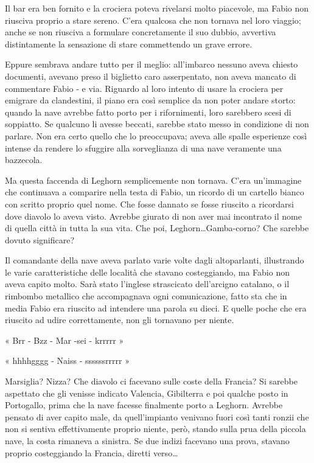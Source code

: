 Il bar era ben fornito e la crociera poteva rivelarsi molto piacevole, ma Fabio non riusciva proprio a stare sereno. C'era qualcosa che non tornava nel loro viaggio; anche se non riusciva a formulare concretamente il suo dubbio, avvertiva distintamente la sensazione di stare commettendo un grave errore.

Eppure sembrava andare tutto per il meglio: all'imbarco nessuno aveva chiesto documenti, avevano preso il biglietto \- caro asserpentato, non aveva mancato di commentare Fabio - e via. Riguardo al loro intento di usare la crociera per emigrare da clandestini, il piano era così semplice da non poter andare storto: quando la nave avrebbe fatto porto per i rifornimenti, loro sarebbero scesi di soppiatto. Se qualcuno li avesse beccati, sarebbe stato messo in condizione di non parlare. Non era certo quello che lo preoccupava; aveva alle spalle esperienze così intense da rendere lo sfuggire alla sorveglianza di una nave veramente una bazzecola.

Ma questa faccenda di Leghorn semplicemente non tornava. C'era un'immagine che continuava a comparire nella testa di Fabio, un ricordo di un cartello bianco con scritto proprio quel nome. Che fosse dannato se fosse riuscito a ricordarsi dove diavolo lo aveva visto. Avrebbe giurato di non aver mai incontrato il nome di quella città in tutta la sua vita. Che poi, Leghorn\ldots Gamba-corno? Che sarebbe dovuto significare?

Il comandante della nave aveva parlato varie volte dagli altoparlanti, illustrando le varie caratteristiche delle località che stavano costeggiando, ma Fabio non aveva capito molto. Sarà stato l'inglese strascicato dell'arcigno catalano, o il rimbombo metallico che accompagnava ogni comunicazione, fatto sta che in media Fabio era riuscito ad intendere una parola su dieci. E quelle poche che era riuscito ad udire correttamente, non gli tornavano per niente.

« Brr - Bzz - Mar -sei - krrrrr »

« hhhhgggg - Naiss - ssssssrrrrr »

Marsiglia? Nizza? Che diavolo ci facevano sulle coste della Francia? Si sarebbe aspettato che gli venisse indicato Valencia, Gibilterra e poi qualche posto in Portogallo, prima che la nave facesse finalmente porto a Leghorn. Avrebbe pensato di aver capito male, da quell'impianto venivano fuori così tanti ronzii che non si sentiva effettivamente proprio niente, però, stando sulla prua della piccola nave, la costa rimaneva a sinistra. Se due indizi facevano una prova, stavano proprio costeggiando la Francia, diretti verso\ldots

